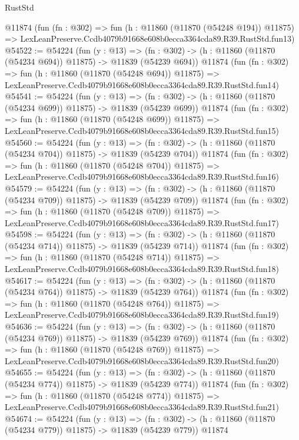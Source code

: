 \begin{lexlean}{RustStd}
\begin{coremodule}
    @11874
    (fun (fn : @302) =>
    fun (h : @11860 (@11870 (@54248 @194)) @11875) =>
    LexLeanPreserve.Ccdb4079b91668e608b0ecca3364cda89.R39.RustStd.fun13)
@54522 := @54224
    (fun (y : @13) =>
    (fn : @302) -> (h : @11860 (@11870 (@54234 @694)) @11875) -> @11839 (@54239 @694))
    @11874
    (fun (fn : @302) =>
    fun (h : @11860 (@11870 (@54248 @694)) @11875) =>
    LexLeanPreserve.Ccdb4079b91668e608b0ecca3364cda89.R39.RustStd.fun14)
@54541 := @54224
    (fun (y : @13) =>
    (fn : @302) -> (h : @11860 (@11870 (@54234 @699)) @11875) -> @11839 (@54239 @699))
    @11874
    (fun (fn : @302) =>
    fun (h : @11860 (@11870 (@54248 @699)) @11875) =>
    LexLeanPreserve.Ccdb4079b91668e608b0ecca3364cda89.R39.RustStd.fun15)
@54560 := @54224
    (fun (y : @13) =>
    (fn : @302) -> (h : @11860 (@11870 (@54234 @704)) @11875) -> @11839 (@54239 @704))
    @11874
    (fun (fn : @302) =>
    fun (h : @11860 (@11870 (@54248 @704)) @11875) =>
    LexLeanPreserve.Ccdb4079b91668e608b0ecca3364cda89.R39.RustStd.fun16)
@54579 := @54224
    (fun (y : @13) =>
    (fn : @302) -> (h : @11860 (@11870 (@54234 @709)) @11875) -> @11839 (@54239 @709))
    @11874
    (fun (fn : @302) =>
    fun (h : @11860 (@11870 (@54248 @709)) @11875) =>
    LexLeanPreserve.Ccdb4079b91668e608b0ecca3364cda89.R39.RustStd.fun17)
@54598 := @54224
    (fun (y : @13) =>
    (fn : @302) -> (h : @11860 (@11870 (@54234 @714)) @11875) -> @11839 (@54239 @714))
    @11874
    (fun (fn : @302) =>
    fun (h : @11860 (@11870 (@54248 @714)) @11875) =>
    LexLeanPreserve.Ccdb4079b91668e608b0ecca3364cda89.R39.RustStd.fun18)
@54617 := @54224
    (fun (y : @13) =>
    (fn : @302) -> (h : @11860 (@11870 (@54234 @764)) @11875) -> @11839 (@54239 @764))
    @11874
    (fun (fn : @302) =>
    fun (h : @11860 (@11870 (@54248 @764)) @11875) =>
    LexLeanPreserve.Ccdb4079b91668e608b0ecca3364cda89.R39.RustStd.fun19)
@54636 := @54224
    (fun (y : @13) =>
    (fn : @302) -> (h : @11860 (@11870 (@54234 @769)) @11875) -> @11839 (@54239 @769))
    @11874
    (fun (fn : @302) =>
    fun (h : @11860 (@11870 (@54248 @769)) @11875) =>
    LexLeanPreserve.Ccdb4079b91668e608b0ecca3364cda89.R39.RustStd.fun20)
@54655 := @54224
    (fun (y : @13) =>
    (fn : @302) -> (h : @11860 (@11870 (@54234 @774)) @11875) -> @11839 (@54239 @774))
    @11874
    (fun (fn : @302) =>
    fun (h : @11860 (@11870 (@54248 @774)) @11875) =>
    LexLeanPreserve.Ccdb4079b91668e608b0ecca3364cda89.R39.RustStd.fun21)
@54674 := @54224
    (fun (y : @13) =>
    (fn : @302) -> (h : @11860 (@11870 (@54234 @779)) @11875) -> @11839 (@54239 @779))
    @11874

\end{coremodule}
\end{lexlean}
